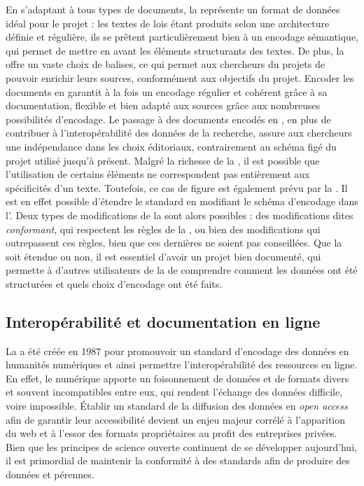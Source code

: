 En s'adaptant à tous types de documents, la \TEI représente un format de données idéal pour le projet \COREL : les textes de lois étant produits selon une architecture définie et régulière, ils se prêtent particulièrement bien à un encodage sémantique, qui permet de mettre en avant les éléments structurants des textes. De plus, la \TEI offre un vaste choix de balises, ce qui permet aux chercheurs du projets de pouvoir enrichir leurs sources, conformément aux objectifs du projet. Encoder les documents en \TEI garantit à la fois un encodage régulier et cohérent grâce à sa documentation, flexible et bien adapté aux sources grâce aux nombreuses possibilités d'encodage. Le passage à des documents encodés en \TEI, en plus de contribuer à l'interopérabilité des données de la recherche, assure aux chercheurs une indépendance dans les choix éditoriaux, contrairement au schéma figé du projet \LSC utilisé jusqu'à présent. Malgré la richesse de la \TEI, il est possible que l'utilisation de certains éléments ne correspondent pas entièrement aux spécificités d'un texte. Toutefois, ce cas de figure est également prévu par la \TEI. Il est en effet possible d'étendre le standard en modifiant le schéma d'encodage dans l'\ODD. Deux types de modifications de la \TEI sont alors possibles : des modifications dites \TEI \textit{conformant}, qui respectent les règles de la \TEI, ou bien des modifications qui outrepassent ces règles, bien que ces dernières ne soient pas conseillées. Que la \TEI soit étendue ou non, il est essentiel d'avoir un projet bien documenté, qui permette à d'autres utilisateurs de la \TEI de comprendre comment les données ont été structurées et quels choix d'encodage ont été faits. 

\subsection{Interopérabilité et documentation en ligne}

La \TEI a été créée en 1987 pour promouvoir un standard d'encodage des données en humanités numériques et ainsi permettre l'interopérabilité des ressources en ligne. En effet, le numérique apporte un foisonnement de données et de formats divers et souvent incompatibles entre eux, qui rendent l'échange des données difficile, voire impossible. Établir un standard de la diffusion des données en \textit{open access} afin de garantir leur accessibilité devient un enjeu majeur corrélé à l'apparition du web et à l'essor des formats propriétaires au profit des entreprises privées. Bien que les principes de science ouverte continuent de se développer aujourd'hui, il est primordial de maintenir la conformité à des standards afin de produire des données \fair et pérennes. 


